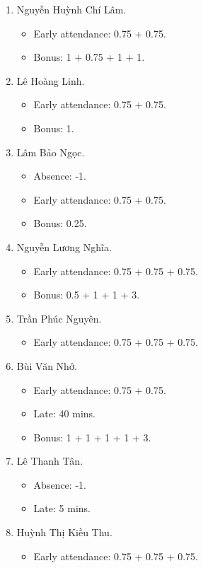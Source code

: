\documentclass{article}
\begin{document}
\begin{enumerate}
\begin{itemize}
	\end{itemize}
	\item {\sc Nguyễn Huỳnh Chí Lâm.}
	\begin{itemize}
		\item Early attendance: 0.75 + 0.75.
		\item Bonus: 1 + 0.75 + 1 + 1.
	\end{itemize}
	\item {\sc Lê Hoàng Linh.}
	\begin{itemize}
		\item Early attendance: 0.75 + 0.75.
		\item Bonus: 1.
	\end{itemize}
	\item {\sc Lâm Bảo Ngọc.}
	\begin{itemize}
		\item Absence: -1.
		\item Early attendance: 0.75 + 0.75.
		\item Bonus: 0.25.
	\end{itemize}	
	\item {\sc Nguyễn Lương Nghĩa.}
	\begin{itemize}
		\item Early attendance: 0.75 + 0.75 + 0.75.
		\item Bonus: 0.5 + 1 + 1 + 3.
	\end{itemize}
	\item {\sc Trần Phúc Nguyên.}
	\begin{itemize}
		\item Early attendance: 0.75 + 0.75 + 0.75.
	\end{itemize}
	\item {\sc Bùi Văn Nhớ}.
	\begin{itemize}
		\item Early attendance: 0.75 + 0.75.
		\item Late: 40 mins.
		\item Bonus: 1 + 1 + 1 + 1 + 3.	
	\end{itemize}
	\item {\sc Lê Thanh Tân.}
	\begin{itemize}
		\item Absence: -1.
		\item Late: 5 mins.
	\end{itemize}
	\item {\sc Huỳnh Thị Kiều Thu.}
	\begin{itemize}
		\item Early attendance: 0.75 + 0.75 + 0.75.

\end{itemize}
\end{enumerate}
\end{document}
